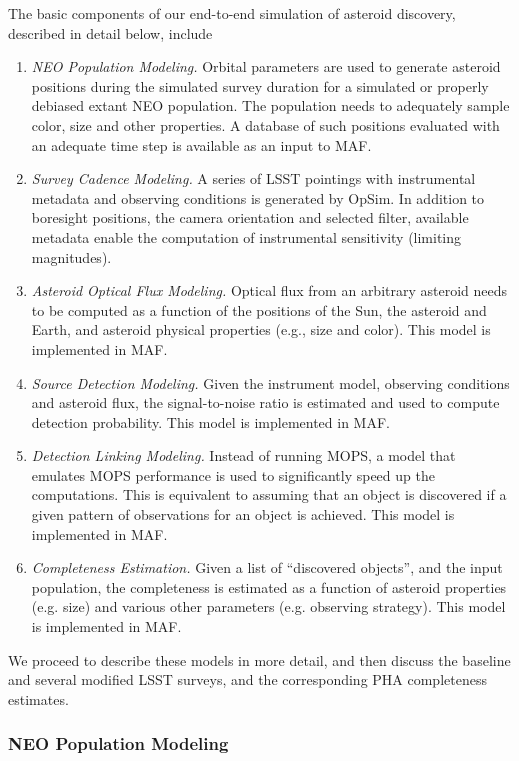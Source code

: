 The basic components of our end-to-end simulation of asteroid discovery, described in detail below, include
\begin{enumerate}
\item {\it NEO Population Modeling.} Orbital parameters are used to generate asteroid positions during the
simulated survey duration for a simulated or properly debiased extant NEO population. The population needs
to adequately sample color, size and other properties. A database of such positions evaluated with an adequate
time step  is available as an input to MAF.
\item {\it Survey Cadence Modeling.} A series of LSST pointings with instrumental metadata and observing conditions
is generated by OpSim. In addition to boresight positions, the camera orientation and selected filter, available
metadata enable the computation of instrumental sensitivity (limiting magnitudes).
\item {\it Asteroid Optical Flux Modeling.}  Optical flux from an arbitrary asteroid needs to be computed
as a function of the positions of the Sun, the asteroid and Earth, and asteroid physical properties (e.g., size
and color). This model is implemented in MAF.
\item {\it Source Detection Modeling.} Given the instrument model, observing conditions and asteroid flux,
the signal-to-noise ratio is estimated and used to compute detection probability. This model is implemented
in MAF.
\item {\it Detection Linking Modeling.}  Instead of running MOPS, a model that emulates MOPS
performance is used to significantly speed up the computations. This is equivalent to assuming that an object is discovered 
if a given pattern of observations for an object is achieved. This model is implemented
in MAF.
\item {\it Completeness Estimation.} Given a list of ``discovered objects'', and the input population,
the completeness is estimated as a function of asteroid properties (e.g. size) and various other parameters
(e.g. observing strategy). This model is implemented in MAF.
\end{enumerate}

We proceed to describe these models in more detail, and then discuss the baseline and several modified LSST
surveys, and the corresponding PHA completeness estimates.

\subsubsection{NEO Population Modeling \label{sec:MAFdetails}}

